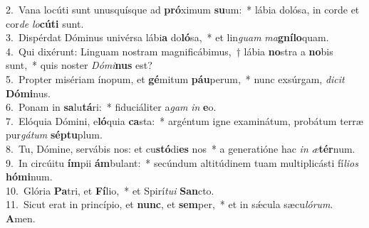 {2.~}Vana locúti sunt unusquísque ad \textbf{pró}ximum \textbf{su}um:~* lábia dolósa, in corde et cor\textit{de} \textit{lo}\textbf{cú}\textbf{ti} sunt.\\
{3.~}Dispérdat Dóminus univérsa lábi\textbf{a} do\textbf{ló}sa,~* et lin\textit{guam} \textit{ma}\textbf{gní}\textbf{lo}quam.\\
{4.~}Qui dixérunt: Linguam nostram magnificábimus,~† lábia \textbf{no}stra a \textbf{no}bis sunt,~* quis noster \textit{Dó}\textit{mi}\textbf{nus} est?\\
{5.~}Propter misériam ínopum, et \textbf{gé}mitum \textbf{páu}perum,~* nunc exsúrgam, \textit{di}\textit{cit} \textbf{Dó}\textbf{mi}nus.\\
{6.~}Ponam in \textbf{sa}lu\textbf{tá}ri:~* fiduciáliter a\textit{gam} \textit{in} \textbf{e}o.\\
{7.~}Elóquia Dómini, e\textbf{ló}quia \textbf{ca}sta:~* argéntum igne examinátum, probátum terræ pur\textit{gá}\textit{tum} \textbf{sép}\textbf{tu}plum.\\
{8.~}Tu, Dómine, servábis nos: et cu\textbf{stó}di\textbf{es} nos~* a generatióne hac \textit{in} \textit{æ}\textbf{tér}num.\\
{9.~}In circúitu \textbf{ím}pii \textbf{ám}bulant:~* secúndum altitúdinem tuam multiplicásti fí\textit{li}\textit{os} \textbf{hó}\textbf{mi}num.\\
{10.~}Glória \textbf{Pa}tri, et \textbf{Fí}lio,~* et Spirí\textit{tu}\textit{i} \textbf{San}cto.\\
{11.~}Sicut erat in princípio, et \textbf{nunc}, et \textbf{sem}per,~* et in sǽcula sæcu\textit{ló}\textit{rum}. \textbf{A}men.\\
